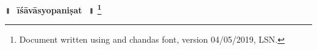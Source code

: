 \documentclass[parskip, DIV=14]{scrartcl}
\renewcommand{\thefootnote}{\fnsymbol{footnote}} %
\begin{document}

\vspace{-1.5cm}

\begin{center}
\textbf{{\Huge॥\,~īśāvāsyopaniṣat\,~॥  \LARGE\let\thefootnote\relax\footnote{\color{lightgray} Document written using \XeLaTeX{} and chandas font,  version 04/05/2019, LSN.}}}
\end{center}
\Large




\end{document}
